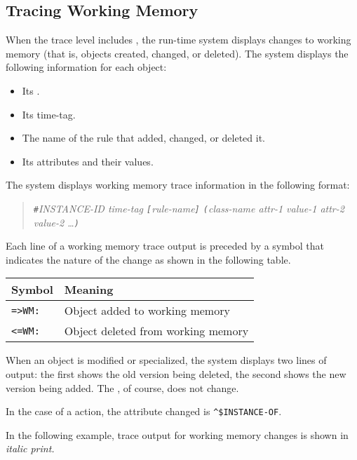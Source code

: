 \subsection{Tracing Working Memory}

When the trace level includes , the run-time system displays
changes to working memory (that is, objects created, changed, or
deleted). The system displays the following information for each
object:

\begin{itemize}
\item Its .
\item Its time-tag.
\item The name of the rule that added, changed, or deleted it.
\item Its attributes and their values.
\end{itemize}

The system displays working memory trace information in the
following format:

\begin{quote}
  \verb|#|\it{INSTANCE-ID} \it{time-tag}
  \verb|[|\it{rule-name}\verb|]| \verb|(|\it{class-name} \it{attr-1}
  \it{value-1} \it{attr-2} \it{value-2} \ldots\verb|)|
\end{quote}

Each line of a working memory trace output is preceded by a symbol
that indicates the nature of the change as shown in the following
table.

\begin{center}
  \begin{tabular}{ll}
    \toprule
    Symbol & Meaning \\
    \midrule
    \verb|=>WM:| & Object added to working memory \\
    \verb|<=WM:| & Object deleted from working memory \\
    \bottomrule
  \end{tabular}
\end{center}

When an object is modified or specialized, the system displays two
lines of output: the first shows the old version being deleted, the
second shows the new version being added. The , of
course, does not change.

In the case of a  action, the attribute changed is
\verb|^$INSTANCE-OF|.

In the following example, trace output for working memory
changes is shown in \it{italic} print.

